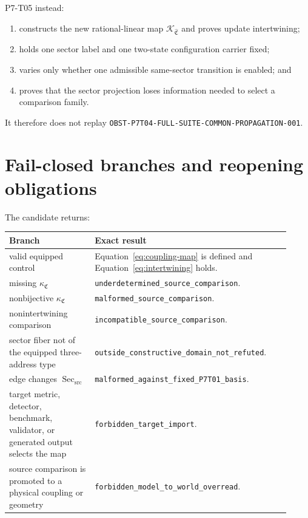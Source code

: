\documentclass[11pt]{article}
\newcommand{\Sec}{\operatorname{Sec}_{\mathrm{src}}}
\newcommand{\Control}{\mathfrak C}
\newcommand{\Kmap}{\mathcal K}
\begin{document}
P7-T05 instead:
\begin{enumerate}[leftmargin=*]
\item constructs the new rational-linear map
  \(\Kmap_{\widehat{\Control}}\) and proves update intertwining;
\item holds one sector label and one two-state configuration carrier fixed;
\item varies only whether one admissible same-sector transition is enabled;
  and
\item proves that the sector projection loses information needed to select a
  comparison family.
\end{enumerate}
It therefore does not replay
\texttt{OBST-P7T04-FULL-SUITE-COMMON-PROPAGATION-001}.

\section{Fail-closed branches and reopening obligations}

The candidate returns:
\begin{longtable}{p{0.29\linewidth}p{0.63\linewidth}}
\toprule
Branch & Exact result\\
\midrule
\endhead
valid equipped control &
Equation~\eqref{eq:coupling-map} is defined and
Equation~\eqref{eq:intertwining} holds.\\
missing \(\kappa_{\Control}\) &
\texttt{underdetermined\_source\_comparison}.\\
nonbijective \(\kappa_{\Control}\) &
\texttt{malformed\_source\_comparison}.\\
nonintertwining comparison &
\texttt{incompatible\_source\_comparison}.\\
sector fiber not of the equipped three-address type &
\texttt{outside\_constructive\_domain\_not\_refuted}.\\
edge changes \(\Sec\) &
\texttt{malformed\_against\_fixed\_P7T01\_basis}.\\
target metric, detector, benchmark, validator, or generated output selects
the map &
\texttt{forbidden\_target\_import}.\\
source comparison is promoted to a physical coupling or geometry &
\texttt{forbidden\_model\_to\_world\_overread}.\\
\bottomrule
\end{longtable}
\end{document}
